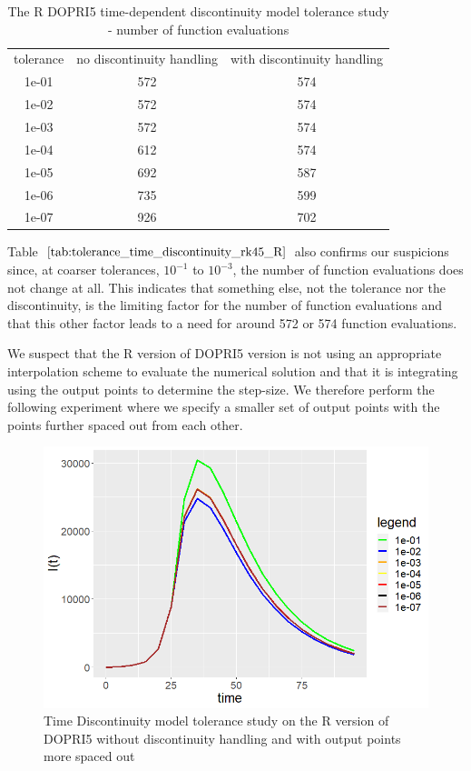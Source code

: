 \begin{table}[H]
\caption {The R DOPRI5 time-dependent discontinuity model tolerance study - number of function evaluations} \label{tab:tolerance_time_discontinuity_rk45_R} 
\begin{center}
\begin{tabular}{ c c c }
tolerance & no discontinuity handling & with discontinuity handling\\ 
1e-01 & 572 & 574 \\
1e-02 & 572 & 574 \\
1e-03 & 572 & 574 \\
1e-04 & 612 & 574 \\
1e-05 & 692 & 587 \\
1e-06 & 735 & 599 \\
1e-07 & 926 & 702 \\
\end{tabular}
\end{center}
\end{table}

Table $\ref{tab:tolerance_time_discontinuity_rk45_R}$ also confirms our suspicions since, at coarser tolerances, $10^{-1}$ to $10^{-3}$, the number of function evaluations does not change at all. This indicates that something else, not the tolerance nor the discontinuity, is the limiting factor for the number of function evaluations and that this other factor leads to a need for around 572 or 574 function evaluations.

We suspect that the R version of DOPRI5 version is not using an appropriate interpolation scheme to evaluate the numerical solution and that it is integrating using the output points to determine the step-size. We therefore perform the following experiment where we specify a smaller set of output points with the points further spaced out from each other.

\begin{figure}[H]
\centering
\includegraphics[width=0.7\linewidth]{./figures/tolerance_time_rk45_further_no_event_R}
\caption{Time Discontinuity model tolerance study on the R version of DOPRI5 without discontinuity handling and with output points more spaced out}
\label{fig:tolerance_time_rk45_further_no_event_R}
\end{figure}


